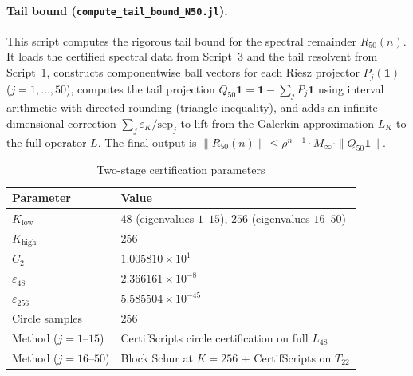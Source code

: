 \documentclass[11pt]{article}
\begin{document}
\paragraph{Tail bound (\texttt{compute\_tail\_bound\_N50.jl}).}
This script computes the rigorous tail bound for the spectral remainder
$R_{50}(n)$.
It loads the certified spectral data from Script~3 and the tail
resolvent from Script~1, constructs componentwise ball vectors for
each Riesz projector $P_j(\mathbf{1})$ ($j = 1, \ldots, 50$),
computes the tail projection $Q_{50}\mathbf{1} = \mathbf{1} - \sum_j P_j\mathbf{1}$
using interval arithmetic with directed rounding (triangle inequality),
and adds an infinite-dimensional correction
$\sum_j \varepsilon_K / \mathrm{sep}_j$ to lift from the Galerkin
approximation $L_K$ to the full operator $L$.
The final output is
$\|R_{50}(n)\| \leq \rho^{n+1} \cdot M_\infty \cdot \|Q_{50}\mathbf{1}\|$.

\begin{table}[ht]
\centering
\caption{Two-stage certification parameters}
\label{S-tab:two-stage-params}
\begin{tabular}{ll}
\toprule
Parameter & Value \\
\midrule
$K_{\mathrm{low}}$ & $48$ (eigenvalues $1$--$15$), $256$ (eigenvalues $16$--$50$) \\
$K_{\mathrm{high}}$ & $256$ \\
$C_2$ & $1.005810 \times 10^{1}$ \\
$\varepsilon_{48}$ & $2.366161 \times 10^{-8}$ \\
$\varepsilon_{256}$ & $5.585504 \times 10^{-45}$ \\
Circle samples & $256$ \\
Method ($j = 1$--$15$) & CertifScripts circle certification on full $L_{48}$ \\
Method ($j = 16$--$50$) & Block Schur at $K = 256$ + CertifScripts on $T_{22}$ \\
\bottomrule
\end{tabular}
\end{table}
\end{document}
